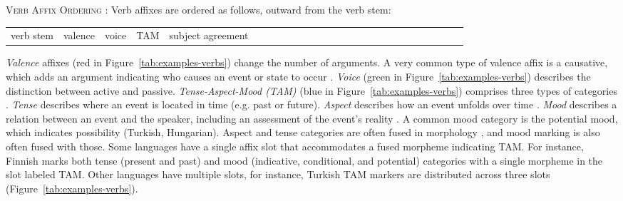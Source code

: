 \documentclass[man]{apa7}
\newcommand{\citep}{\parencite}
\begin{document}
\begin{adjustwidth}{6em}{6em}
\textsc{Verb Affix Ordering} \citep{bybee-morphology-1985}:
Verb affixes are ordered as follows, outward from the verb stem:

\begin{tabular}{llllllllllllllllllllllllll}
verb stem & valence & voice & TAM & subject agreement
\end{tabular}
\end{adjustwidth}

\textit{Valence} affixes (red in Figure~\ref{tab:examples-verbs}) change the number of arguments. A very common type of valence affix is a causative, which adds an argument indicating who causes an event or state to occur \citep{wals-111}.
\textit{Voice} (green in Figure~\ref{tab:examples-verbs}) describes the distinction between active and passive. %
\textit{Tense-Aspect-Mood (TAM)} (blue in Figure~\ref{tab:examples-verbs}) comprises three types of categories \citep[Tense-Aspect-Mood,][]{bybee1994the, wals-69}.
\textit{Tense} describes where an event is located in time (e.g. past or future).
\textit{Aspect} describes how an event unfolds over time \citep{comrie1976aspect,dahl1985tense,binnick1991time}.
\textit{Mood} describes a relation between an event and the speaker, including an assessment of the event's reality \citep{palmer1986mood,portner2018mood}.
A common mood category is the potential mood, which indicates possibility (Turkish, Hungarian).
Aspect and tense categories are often fused in morphology \citep{binnick2012the}, and mood marking is also often fused with those. %
Some languages have a single affix slot that accommodates a fused morpheme indicating TAM.
For instance, Finnish marks both tense (present and past) and mood (indicative, conditional, and potential) categories with a single morpheme in the slot labeled TAM.
Other languages have multiple slots, for instance, Turkish TAM markers are distributed across three slots (Figure~\ref{tab:examples-verbs}).
\end{document}
